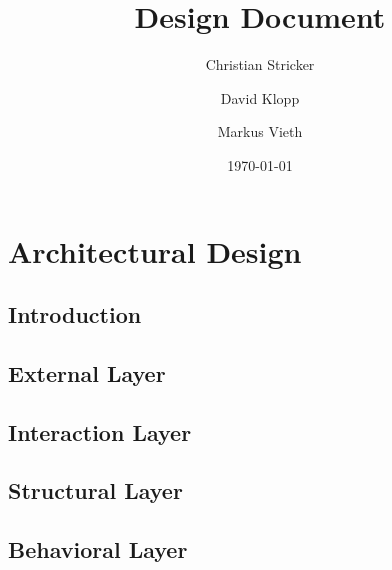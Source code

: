 \documentclass{book}
\title{Design Document}
\author{Christian Stricker \and David Klopp \and Markus Vieth}
\date{\today}
\begin{document}
\frontmatter
\maketitle
\tableofcontents
\mainmatter
\part{Architectural Design}

\chapter{Introduction}
 
 
\chapter{External Layer}


\chapter{Interaction Layer}


\chapter{Structural Layer}


\chapter{Behavioral Layer}


 
\end{document}
